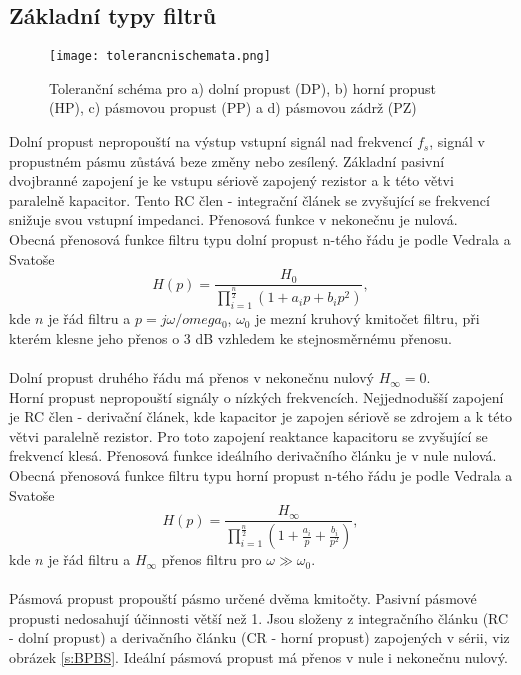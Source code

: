 \subsection{Základní typy filtrů}
\begin{figure}[h]
\centering
\texttt{[image: tolerancnischemata.png]}
\caption[Toleranční schéma dolní propusti (DP), horní propusti (HP), pásmové propusti (PP) a pásmové zádrže]{Toleranční schéma pro a) dolní propust (DP), b) horní propust (HP), c) pásmovou propust (PP) a d) pásmovou zádrž (PZ)\cite{7}}
\end{figure}
\noindent Dolní propust nepropouští na výstup vstupní signál nad frekvencí $f_s$, signál v propustném pásmu zůstává beze změny nebo zesílený. Základní pasivní dvojbranné zapojení je ke vstupu sériově zapojený rezistor a k této větvi paralelně kapacitor. Tento RC člen - integrační článek se zvyšující se frekvencí snižuje svou vstupní impedanci. Přenosová funkce v nekonečnu je nulová. \\
Obecná přenosová funkce filtru typu dolní propust n-tého řádu je podle Vedrala a Svatoše~\cite{8}
\begin{equation}
H(p) = \frac{H_0}{\prod_{i=1}^{\frac{n}{2}} (1 + a_i p + b_i p^2)} \label{r:FTR},
\end{equation}
kde $n$ je řád filtru a $p = j\omega/omega_0$, $\omega_0$ je mezní kruhový kmitočet filtru, při kterém klesne jeho přenos o 3 dB vzhledem ke stejnosměrnému přenosu.\\
\\
Dolní propust druhého řádu má přenos v nekonečnu nulový $H_{\infty} = 0$. \\
Horní propust nepropouští signály o nízkých frekvencích. Nejjednodušší zapojení je RC člen - derivační článek, kde kapacitor je zapojen sériově se zdrojem a k této větvi paralelně rezistor. Pro toto zapojení reaktance kapacitoru se zvyšující se frekvencí klesá. Přenosová funkce ideálního derivačního článku je v nule nulová. \\
Obecná přenosová funkce filtru typu horní propust n-tého řádu je podle Vedrala a Svatoše~\cite{8}
\begin{equation}
H(p) = \frac{H_{\infty}}{\prod_{i=1}^{\frac{n}{2}} (1 + \frac{a_i}{p} + \frac{b_i}{p^2})} \label{r:FTR2},
\end{equation}
kde $n$ je řád filtru a $H_{\infty}$ přenos filtru pro $\omega \gg \omega_0$.\\
\\
\noindent Pásmová propust propouští pásmo určené dvěma kmitočty. Pasivní pásmové propusti nedosahují účinnosti větší než 1. Jsou složeny z integračního článku (RC - dolní propust) a derivačního článku (CR - horní propust) zapojených v sérii, viz obrázek \ref{s:BPBS}. Ideální pásmová propust má přenos v nule i nekonečnu nulový. \\

